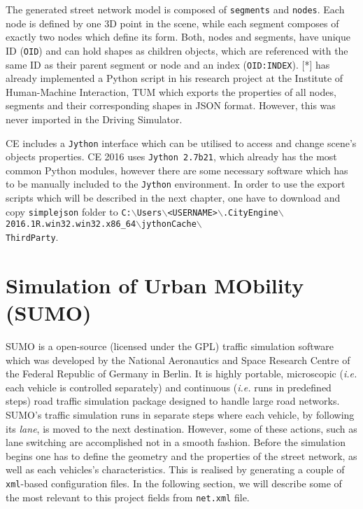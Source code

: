 The generated street network model is composed of \texttt{segments} and \texttt{nodes}. Each node is defined by one 3D point in the scene, while each segment composes of exactly two nodes which define its form. Both, nodes and segments, have unique ID (\texttt{OID}) and can hold shapes as children objects, which are referenced with the same ID as their parent segment or node and an index (\texttt{OID:INDEX}). [*] has already implemented a Python script in his research project at the Institute of Human-Machine Interaction, TUM which exports the properties of all nodes, segments and their corresponding shapes in JSON format. However, this was never imported in the Driving Simulator.

CE includes a \texttt{Jython} interface which can be utilised to access and change scene's objects properties. CE 2016 uses \texttt{Jython 2.7b21}, which already has the most common Python modules, however there are some necessary software which has to be manually included to the \texttt{Jython} environment. In order to use the export scripts which will be described in the next chapter, one have to download and copy \texttt{simplejson} folder to \texttt{C:$\backslash$Users$\backslash$<USERNAME>$\backslash$.CityEngine$\backslash$2016.1R.win32.win32.x86\_64$\backslash$jythonCache$\backslash$\\ThirdParty}.

\section{Simulation of Urban MObility (SUMO)}
\label{ch:sumo}
SUMO is a open-source (licensed under the GPL) traffic simulation software which was developed by the National Aeronautics and Space Research Centre of the Federal Republic of Germany in Berlin. It is highly portable, microscopic (\emph{i.e.} each vehicle is controlled separately) and continuous (\emph{i.e.} runs in predefined steps) road traffic simulation package designed to handle large road networks. SUMO's traffic simulation runs in separate steps where each vehicle, by following its \emph{lane}, is moved to the next destination. However, some of these actions, such as lane switching are accomplished not in a smooth fashion. Before the simulation begins one has to define the geometry and the properties of the street network, as well as each vehicles's characteristics. This is realised by generating a couple of \texttt{xml}-based configuration files. In the following section, we will describe some of the most relevant to this project fields from \texttt{net.xml} file.

